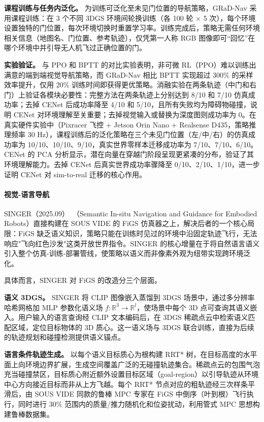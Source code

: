 \textbf{课程训练与任务内泛化。}
为训练可泛化至未见门位置的导航策略，GRaD-Nav 采用课程训练：在 3 个不同 3DGS 环境间轮换训练（各 100 轮 $\times$ 5 次），每个环境设置独特的门位置，每次环境切换时重置学习率。训练完成后，策略无需任何环境相关信息（地图名、门位置、参考轨迹），仅凭第一人称 RGB 图像即可``回忆''在哪个环境中并引导无人机飞过正确位置的门。

\textbf{实验验证。}
与 PPO 和 BPTT 的对比实验表明，非可微 RL（PPO）难以训练出满意的端到端视觉导航策略，而 GRaD-Nav 相比 BPTT 实现超过 300\% 的采样效率提升，仅用 20\% 训练时间即获得更优策略。消融实验在两条轨迹（中门和右门）上验证各模块必要性：完整方法在两条轨迹上分别达到 8/10 和 7/10 仿真成功率；去掉 CENet 后成功率降至 4/10 和 5/10，且所有失败均为障碍物碰撞，说明 CENet 对环境理解至关重要；去掉视觉输入或替换为深度图则成功率为 0。在真实硬件实验中（Pixracer 飞控 + Jetson Orin Nano + Realsense D435，策略推理频率 30 Hz），课程训练后的泛化策略在三个未见门位置（左/中/右）的仿真成功率为 10/10、10/10、9/10，真实世界零样本迁移成功率为 7/10、7/10、6/10。CENet 的 PCA 分析显示，潜在向量在穿越门阶段呈现更紧凑的分布，验证了其环境理解能力。去掉 CENet 后真实世界成功率骤降至 0/10、2/10、1/10，进一步证明 CENet 对 sim-to-real 迁移的核心作用。

\paragraph{视觉-语言导航}

SINGER（2025.09）~\cite{2509_18610}（Semantic In-situ Navigation and Guidance for Embodied Robots）直接构建在 SOUS VIDE 的 FiGS 仿真器之上，解决后者的一个核心局限：FiGS 缺乏语义知识，策略只能在训练时见过的环境中沿固定轨迹飞行，无法响应"飞向红色沙发"这类开放世界指令。SINGER 的核心增量在于将自然语言语义引入整个仿真-训练-部署管线，使策略以语义而非像素外观为纽带实现跨环境泛化。

具体而言，SINGER 对 FiGS 的改造分三个层面。

\textbf{语义 3DGS。}
SINGER 将 CLIP 图像嵌入蒸馏到 3DGS 场景中，通过多分辨率哈希网格加 MLP 参数化语义场 $f: \mathbb{R}^3 \to \mathbb{R}^l$，使场景中每个 3D 点可查询其语义嵌入。用户输入的语言查询经 CLIP 文本编码后，在 3DGS 稀疏点云中检索语义匹配区域，定位目标物体的 3D 质心。这一语义场与 3DGS 联合训练，直接为后续的轨迹规划和碰撞检测提供语义锚点。

\textbf{语言条件轨迹生成。}
以每个语义目标质心为根构建 RRT* 树，在目标高度的水平面上向环境边界扩展，生成空间覆盖广泛的无碰撞轨迹集合。稀疏点云的包围气泡充当碰撞禁区，目标质心附近额外设置目标区域（goal-region）以引导轨迹从环境中心方向接近目标而非从上方飞越。每个 RRT* 节点对应的粗轨迹经三次样条平滑后，由 SOUS VIDE 同款的鲁棒 MPC 专家在 FiGS 中倒序（叶到根）飞行执行，同时进行 30\% 范围内的质量/推力随机化和位姿扰动，利用管式 MPC 思想构建鲁棒数据集。

